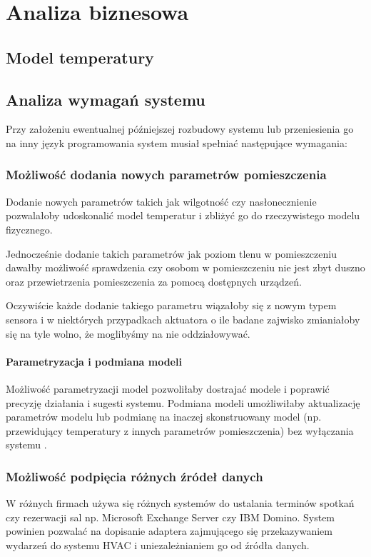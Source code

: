 \chapter{Analiza biznesowa}

\section{Model temperatury}


\section{Analiza wymagań systemu}
Przy założeniu ewentualnej późniejszej rozbudowy systemu lub przeniesienia go na inny język programowania system musiał spełniać następujące wymagania:

\subsection*{Możliwość dodania nowych parametrów pomieszczenia}
Dodanie nowych parametrów takich jak wilgotność czy nasłonecznienie pozwalałoby udoskonalić model temperatur i zbliżyć go do rzeczywistego modelu fizycznego.

Jednocześnie dodanie takich parametrów jak poziom tlenu w pomieszczeniu dawałby możliwość sprawdzenia czy osobom w pomieszczeniu nie jest zbyt duszno oraz przewietrzenia pomieszczenia za pomocą dostępnych urządzeń.

Oczywiście każde dodanie takiego parametru wiązałoby się z nowym typem sensora i w niektórych przypadkach aktuatora o ile badane zajwisko zmianiałoby się na tyle wolno, że moglibyśmy na nie oddziałowywać.

\subsubsection*{Parametryzacja i podmiana modeli}
Możliwość parametryzacji model pozwoliłaby dostrajać modele i poprawić precyzję działania i sugesti systemu.
Podmiana modeli umożliwiłaby aktualizację parametrów modelu lub podmianę na inaczej skonstruowany model (np. przewidujący temperatury z innych parametrów pomieszczenia) bez wyłączania systemu . 

\subsection*{Możliwość podpięcia różnych źródeł danych}
W różnych firmach używa się różnych systemów do ustalania terminów spotkań czy rezerwacji sal np. Microsoft Exchange Server czy IBM Domino.
System powinien pozwalać na dopisanie adaptera zajmującego się przekazywaniem wydarzeń do systemu HVAC i uniezależnianiem go od źródła danych.

